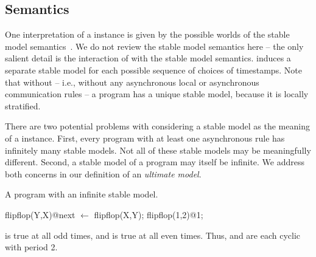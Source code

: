 


\subsection{Semantics}
One interpretation of a \lang instance is given by the possible worlds of the
stable model semantics~\cite{stable-model}.  We do not review the stable model
semantics here -- the only salient detail is the interaction of 
with the stable model semantics.   induces a separate stable
model for each possible sequence of choices of timestamps.  Note that without
 -- i.e., without any asynchronous local or asynchronous
communication rules -- a \lang program has a unique stable model, because it is
locally stratified.

There are two potential problems with considering a stable model as the meaning of a \lang instance.  First, every program with at least one asynchronous rule has infinitely many stable models.  Not all of these stable models may be meaningfully different.  Second, a stable model of a \lang program may itself be infinite.  We address both concerns in our definition of an {\em ultimate model}.

\begin{example}
\label{ex:flipflop}
A \lang program with an infinite stable model.

\begin{Dedalus}
flipflop(Y,X)@next \(\leftarrow\) flipflop(X,Y);
flipflop(1,2)@1;
\end{Dedalus}

 is true at all odd times, and  is true at all even times.  Thus,  and  are each cyclic with period 2.
\end{example}

